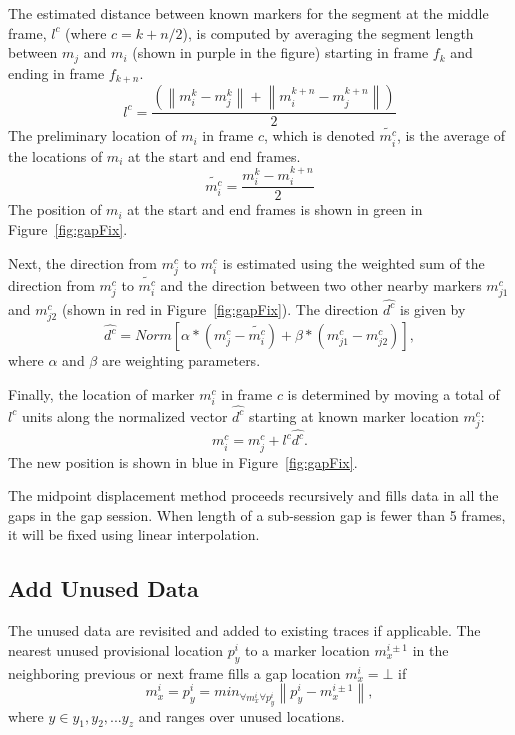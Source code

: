 The estimated distance between known markers for the segment at the middle frame, $l^c$ (where $c=k+n/2$), is computed by averaging the segment length between $m_j$ and $m_i$ (shown in purple in the figure) starting in frame $f_k$ and ending in frame $f_{k+n}$. 
\begin{equation}\label{eq:6}
l^c=\frac{\left(\left\|m_i^k-m_j^k\right\|+\left\|m_i^{k+n}-m_j^{k+n}\right\|\right)}{2}
\end{equation}   
The preliminary location of $m_i$ in frame $c$, which is denoted $\tilde{m_i^c}$, is the average of the locations of $m_i$ at the start and end frames. 
\begin{equation}\label{eq:7}
\tilde{m_i^c}=\frac{m_i^k-m_i^{k+n}}{2}
\end{equation}
The position of $m_i$ at the start and end frames is shown in green in Figure~\ref{fig:gapFix}. 

Next, the direction from $m_j^c$ to $m_i^c$ is estimated using the weighted sum of the direction from $m_j^c$ to $\tilde{m_i^c}$ and the direction between two other nearby markers $m_{j1}^c$ and $m_{j2}^c$ (shown in red in Figure~\ref{fig:gapFix}).   
The direction $\hat{d^c}$ is given by 
\begin{equation}\label{eq:8}
\hat{d^c}=Norm\left[\alpha*\left(m_j^c-\tilde{m_i^c}\right)+\beta*\left(m_{j1}^c-m_{j2}^c\right)\right],
\end{equation}
where $\alpha$ and $\beta$ are weighting parameters.   

Finally, the location of marker $m_i^c$ in frame $c$ is determined by moving a total of $l^c$ units along the normalized vector $\hat{d^c}$ starting at known marker location $m_j^c$:
\begin{equation}\label{eq:9}
m_i^c=m_j^c+l^c\hat{d^c}.
\end{equation}
The new position is shown in blue in Figure~\ref{fig:gapFix}. 

The midpoint displacement method proceeds recursively and fills data in all the gaps in the gap session. When length of a sub-session gap is fewer than 5 frames, it will be fixed using linear interpolation. 

\subsection{Add Unused Data}
\label{sec:addUnusedSec}

The unused data are revisited and added to existing traces if applicable. The nearest unused provisional location $p_y^{i}$ to a marker location $m_x^{i\pm1}$ in the neighboring previous or next frame fills a gap location $m_x^i = \bot$ if 
\begin{equation}
m_x^i=p_y^i=min_{\forall{m_x^i}\forall{p_y^i}}\left\|p_y^i-m_x^{i\pm1}\right\|,
\label{eq:addUnused}
\end{equation}
where $y\in{y_1,y_2,...y_z}$ and ranges over unused locations. 

